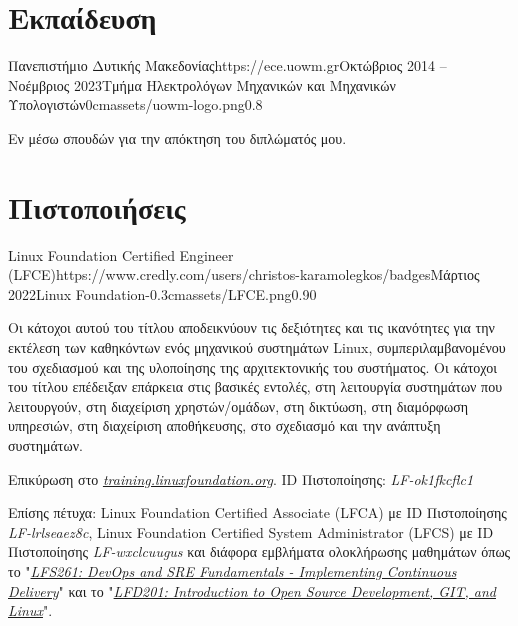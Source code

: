 \documentclass{mycv}
\begin{document}
	\section{Εκπαίδευση}

	\begin{EntryDatedLogo}{Πανεπιστήμιο Δυτικής Μακεδονίας}{https://ece.uowm.gr}{Οκτώβριος 2014 -- Νοέμβριος 2023}{Τμήμα Ηλεκτρολόγων Μηχανικών και Μηχανικών Υπολογιστών}{0cm}{assets/uowm-logo.png}{0.8}
		\vspace{-0.2cm}
		\begin{Itemize}
			\item Εν μέσω σπουδών για την απόκτηση του διπλώματός μου.
		\end{Itemize}
	\end{EntryDatedLogo}

	\section{Πιστοποιήσεις}
    \begin{EntryDatedLogo}{Linux Foundation Certified Engineer (LFCE)}{https://www.credly.com/users/christos-karamolegkos/badges}{Μάρτιος 2022}{Linux Foundation}{-0.3cm}{assets/LFCE.png}{0.90}
    	\vspace{-0.2cm}
		\begin{Itemize}
			\item Οι κάτοχοι αυτού του τίτλου αποδεικνύουν τις δεξιότητες και τις ικανότητες για την εκτέλεση των καθηκόντων ενός μηχανικού συστημάτων Linux, συμπεριλαμβανομένου του σχεδιασμού και της υλοποίησης της αρχιτεκτονικής του συστήματος. Οι κάτοχοι του τίτλου επέδειξαν επάρκεια στις βασικές εντολές, στη λειτουργία συστημάτων που λειτουργούν, στη διαχείριση χρηστών/ομάδων, στη δικτύωση, στη διαμόρφωση υπηρεσιών, στη διαχείριση αποθήκευσης, στο σχεδιασμό και την ανάπτυξη συστημάτων.
			\item Επικύρωση στο \href{https://training.linuxfoundation.org/certification/verify-linux-certifications}{\textit{training.linuxfoundation.org}}. ID Πιστοποίησης: \textit{LF-ok1fkcflc1}
			\item Επίσης πέτυχα: Linux Foundation Certified Associate (LFCA) με ID Πιστοποίησης \textit{LF-lrlseaez8c}, Linux Foundation Certified System Administrator (LFCS) με ID Πιστοποίησης \textit{LF-wxclcuugus} και διάφορα εμβλήματα ολοκλήρωσης μαθημάτων όπως το "\href{https://www.credly.com/badges/19ff66ca-2e10-4e1b-90a9-1c1ac6132878}{\textit{LFS261: DevOps and SRE Fundamentals - Implementing Continuous Delivery}}" και το "\href{https://www.credly.com/badges/1fc7edfc-227e-4e93-ac46-297ab05c27db}{\textit{LFD201: Introduction to Open Source Development, GIT, and Linux}}".
		\end{Itemize}
	\end{EntryDatedLogo}
\end{document}
